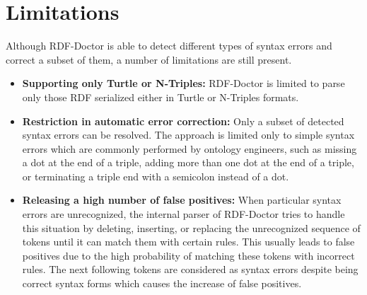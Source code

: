 

\section{Limitations}
Although RDF-Doctor is able to detect different types of syntax errors and correct a subset of them, a number of limitations are still present. 
\begin{itemize}

    \item \textbf{Supporting only Turtle or N-Triples:} RDF-Doctor is limited to parse only those RDF serialized either in Turtle or N-Triples formats. 
    \item \textbf{Restriction in automatic error correction:} Only a subset of  detected syntax errors can be resolved. 
    The approach is limited only to simple syntax errors which are commonly performed by ontology engineers, such as missing a dot at the end of a triple, adding more than one dot at the end of a triple, or terminating a triple end with a semicolon instead of a dot.   

    \item \textbf{Releasing a high number of false positives:} When particular syntax errors are unrecognized, the internal parser of RDF-Doctor tries to handle this situation by deleting, inserting, or replacing the unrecognized sequence of tokens until it can match them with certain rules.
    This usually leads to false positives due to the high probability of matching these tokens with incorrect rules.
    The next following tokens are considered as syntax errors despite being correct syntax forms which causes the increase of false positives.  

\end{itemize}


